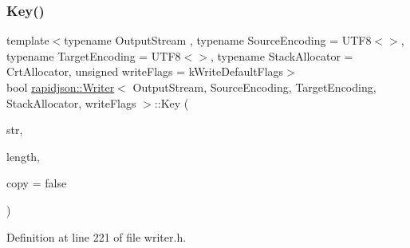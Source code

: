 \subsubsection{\texorpdfstring{Key()}{Key()}\hspace{0.1cm}{\footnotesize\ttfamily [1/2]}}
{\footnotesize\ttfamily template$<$typename Output\+Stream , typename Source\+Encoding  = U\+T\+F8$<$$>$, typename Target\+Encoding  = U\+T\+F8$<$$>$, typename Stack\+Allocator  = Crt\+Allocator, unsigned write\+Flags = k\+Write\+Default\+Flags$>$ \\
bool \mbox{\hyperlink{classrapidjson_1_1_writer}{rapidjson\+::\+Writer}}$<$ Output\+Stream, Source\+Encoding, Target\+Encoding, Stack\+Allocator, write\+Flags $>$\+::Key (\begin{DoxyParamCaption}\item[{const \mbox{\hyperlink{classrapidjson_1_1_writer_a2cf973937ca1110293bf1350fac2a6d6}{Ch}} $\ast$}]{str,  }\item[{\mbox{\hyperlink{namespacerapidjson_a44eb33eaa523e36d466b1ced64b85c84}{Size\+Type}}}]{length,  }\item[{bool}]{copy = {\ttfamily false} }\end{DoxyParamCaption})}



Definition at line 221 of file writer.\+h.


\begin{DoxyCode}{0}

\end{DoxyCode}
\mbox{\label{classrapidjson_1_1_writer_adb7804b54bcd5e71c69ec219652787d5}} 

